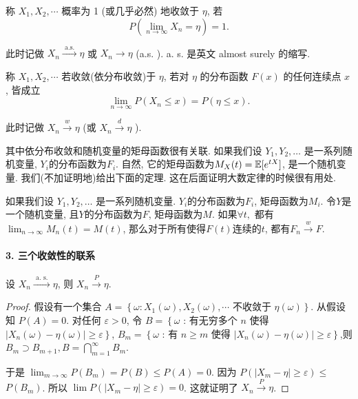 \begin{definition}
    称 $X_1, X_2, \cdots$ 概率为 1 (或几乎必然) 地收敛于 $\eta$, 若
$$
P\left(\lim _{n \rightarrow \infty} X_n=\eta\right)=1 .
$$

此时记做 $X_n \stackrel{\text { a.s. }}{\longrightarrow} \eta$ 或 $X_n \rightarrow \eta$ (a.s. ). a. s. 是英文 almost surely 的缩写.
\end{definition}

\begin{definition}
    称 $X_1, X_2, \cdots$ 若收敛(依分布收敛)于 $\eta$, 若对 $\eta$ 的分布函数 $F(x)$ 的任何连续点 $x$, 皆成立
    $$
    \lim _{n \rightarrow \infty} P\left(X_n \leqslant x\right)=P(\eta \leqslant x) .
    $$
    
    此时记做 $X_n \stackrel{w}{\longrightarrow} \eta$ (或 $X_n \stackrel{d}{\longrightarrow} \eta$ ).
\end{definition}

其中依分布收敛和随机变量的矩母函数很有关联. 如果我们设 $Y_1, Y_2, \dots$ 是一系列随机变量, $Y_i$的分布函数为$F_i$. 自然, 它的矩母函数为$M_X(t)=\mathbb E[ e^{t X}]$, 是一个随机变量. 我们(不加证明地)给出下面的定理. 这在后面证明大数定律的时候很有用处. 

\begin{theorem}
    \label{thm:dist-moment}
    如果我们设 $Y_1, Y_2, \dots$ 是一系列随机变量. $Y_i$的分布函数为$F_i$, 矩母函数为$M_i$. 令$Y$是一个随机变量, 且$Y$的分布函数为$F$, 矩母函数为$M$. 如果$\forall t,$ 都有$\lim _{n \rightarrow \infty} M_n(t)=M(t)$, 那么对于所有使得$F(t)$连续的$t$, 都有$F_n \stackrel{w}{\longrightarrow} F$. 
\end{theorem}

\paragraph{3. 三个收敛性的联系}

\begin{theorem}
    设 $X_n \stackrel{\text { a. s. }}{\longrightarrow} \eta$, 则 $X_n \stackrel{P}{\longrightarrow} \eta$.
\end{theorem}

\begin{proof}
    假设有一个集合 $A=\left\{\omega: X_1(\omega), X_2(\omega), \cdots\right.$ 不收敛于 $\left.\eta(\omega)\right\}$. 从假设知 $P(A)=0$. 对任何 $\varepsilon>0$, 令
$B=\left\{\omega\right.$ : 有无穷多个 $n$ 使得 $\left.\left|X_n(\omega)-\eta(\omega)\right| \geqslant \varepsilon\right\}$,
$B_m=\left\{\omega\right.$ : 有 $n \geqslant m$ 使得 $\left.\left|X_n(\omega)-\eta(\omega)\right| \geqslant \varepsilon\right\}$,则 $B_m \supset B_{m+1}, B=\bigcap_{m=1}^{\infty} B_m$.

于是 $\lim _{m \rightarrow \infty} P\left(B_m\right)=P(B) \leqslant P(A)=0$. 因为 $P\left(\left|X_m-\eta\right| \geqslant \varepsilon\right) \leqslant$ $P\left(B_m\right)$. 所以 $\lim P\left(\left|X_m-\eta\right| \geqslant \varepsilon\right)=0$. 这就证明了 $X_n \stackrel{P}{\longrightarrow} \eta$.
\end{proof}

